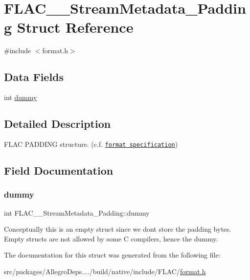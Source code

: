 \hypertarget{struct_f_l_a_c_____stream_metadata___padding}{}\section{F\+L\+A\+C\+\_\+\+\_\+\+Stream\+Metadata\+\_\+\+Padding Struct Reference}
\label{struct_f_l_a_c_____stream_metadata___padding}


{\ttfamily \#include $<$format.\+h$>$}

\subsection*{Data Fields}
\begin{DoxyCompactItemize}
\item 
int \hyperlink{struct_f_l_a_c_____stream_metadata___padding_a5214437fcba7d6abdc3b2435dcaa4124}{dummy}
\end{DoxyCompactItemize}


\subsection{Detailed Description}
F\+L\+AC P\+A\+D\+D\+I\+NG structure. (c.\+f. \href{../format.html#metadata_block_padding}{\tt format specification}) 

\subsection{Field Documentation}
\mbox{\label{struct_f_l_a_c_____stream_metadata___padding_a5214437fcba7d6abdc3b2435dcaa4124}} 
\subsubsection{\texorpdfstring{dummy}{dummy}}
{\footnotesize\ttfamily int F\+L\+A\+C\+\_\+\+\_\+\+Stream\+Metadata\+\_\+\+Padding\+::dummy}

Conceptually this is an empty struct since we don\textquotesingle{}t store the padding bytes. Empty structs are not allowed by some C compilers, hence the dummy. 

The documentation for this struct was generated from the following file\+:\begin{DoxyCompactItemize}
\item 
src/packages/\+Allegro\+Deps..../build/native/include/\+F\+L\+A\+C/\hyperlink{format_8h}{format.\+h}\end{DoxyCompactItemize}
